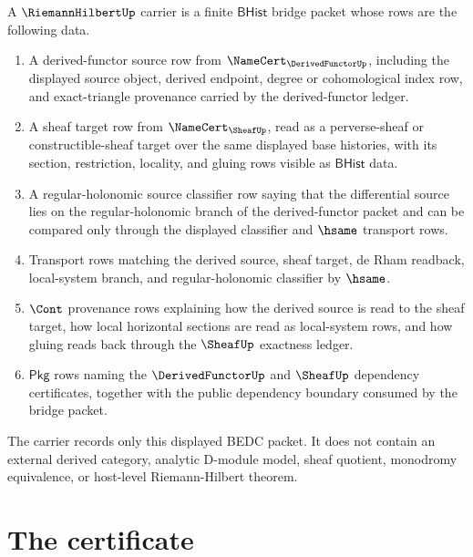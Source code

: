 \begin{definition}
\label{def:riemannhilbert-bhist-bridge-packet}
A $\RiemannHilbertUp$ carrier is a finite $\mathsf{BHist}$ bridge packet whose rows are the following data.

\begin{enumerate}
\item A derived-functor source row from $\NameCert_{\DerivedFunctorUp}$, including the displayed source object, derived endpoint, degree or cohomological index row, and exact-triangle provenance carried by the derived-functor ledger.

\item A sheaf target row from $\NameCert_{\SheafUp}$, read as a perverse-sheaf or constructible-sheaf target over the same displayed base histories, with its section, restriction, locality, and gluing rows visible as $\mathsf{BHist}$ data.

\item A regular-holonomic source classifier row saying that the differential source lies on the regular-holonomic branch of the derived-functor packet and can be compared only through the displayed classifier and $\hsame$ transport rows.

\item Transport rows matching the derived source, sheaf target, de Rham readback, local-system branch, and regular-holonomic classifier by $\hsame$.

\item $\Cont$ provenance rows explaining how the derived source is read to the sheaf target, how local horizontal sections are read as local-system rows, and how gluing reads back through the $\SheafUp$ exactness ledger.

\item $\mathsf{Pkg}$ rows naming the $\DerivedFunctorUp$ and $\SheafUp$ dependency certificates, together with the public dependency boundary consumed by the bridge packet.
\end{enumerate}

The carrier records only this displayed BEDC packet. It does not contain an external derived category, analytic D-module model, sheaf quotient, monodromy equivalence, or host-level Riemann-Hilbert theorem.
\end{definition}

\section{The certificate}
\label{sec:riemannhilbert-certificate}

